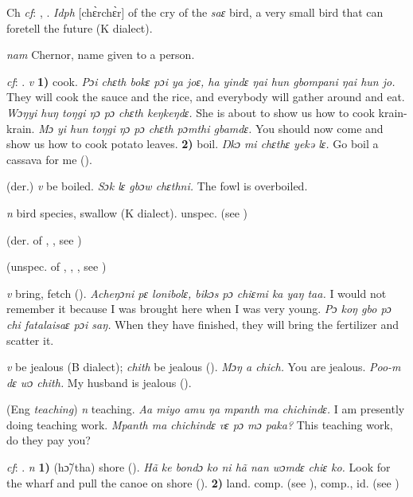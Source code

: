 \begin{letter}{Ch}
 \textit{cf}: , . \textit{Idph} [chɛ̀rchɛ̀r] of the cry of the \textit{saɛ} bird, a very small bird that can foretell the future (K dialect). 

 \textit{nam} Chernor, name given to a person. 

 \textit{cf}: . \textit{v} \textbf{1)} cook. \textit{Pɔi chɛth bokɛ pɔi ya joɛ, ha yindɛ ŋai hun gbompani ŋai hun jo.} They will cook the sauce and the rice, and everybody will gather around and eat. \textit{Wɔŋyi huŋ toŋgi ŋɔ pɔ chɛth keŋkeŋdɛ.} She is about to show us how to cook krain-krain. \textit{Mɔ yi hun toŋgi ŋɔ pɔ chɛth pɔmthi gbamdɛ.} You should now come and show us how to cook potato leaves. \textbf{2)} boil. \textit{Ŋkɔ mi chɛthɛ yekə lɛ.} Go boil a cassava for me (\citealt{Pichl1967}). 

 (der.) \textit{v} be boiled. \textit{Sɔk lɛ gbɔw chɛthni.} The fowl is overboiled.

 \textit{n} bird species, swallow (K dialect). unspec.  (see ) 

 (der. of , , see ) 

 (unspec. of , , , see ) 

 \textit{v} bring, fetch (\citealt{Pichl1967}). \textit{Acheŋɔni pɛ lonibolɛ, bikɔs pɔ chiɛmi ka yaŋ taa.} I would not remember it because I was brought here when I was very young. \textit{Pɔ koŋ gbo pɔ chi fatalaisaɛ pɔi saŋ.} When they have finished, they will bring the fertilizer and scatter it.

 \textit{v} be jealous (B dialect); \textit{chith} be jealous (\citealt{Pichl1967}). \textit{Mɔŋ a chich.} You are jealous. \textit{Poo-m dɛ wɔ chith.} My husband is jealous (\citealt{Pichl1967}). 

 (Eng \textit{teaching}) \textit{n} teaching. \textit{Aa miyo amu ŋa mpanth ma chichindɛ.} I am presently doing teaching work. \textit{Mpanth ma chichindɛ vɛ pɔ mɔ paka?} This teaching work, do they pay you?

 \textit{cf}: . \textit{n} \textbf{1)} (hɔ̃/tha) shore (\citealt{Pichl1967}). \textit{Hã ke bondɔ ko ni hã nan wɔmdɛ chiɛ ko.} Look for the wharf and pull the canoe on shore (\citealt{Pichl1967}). \textbf{2)} land. comp.  (see ), comp., id.  (see ) 


\end{letter}
